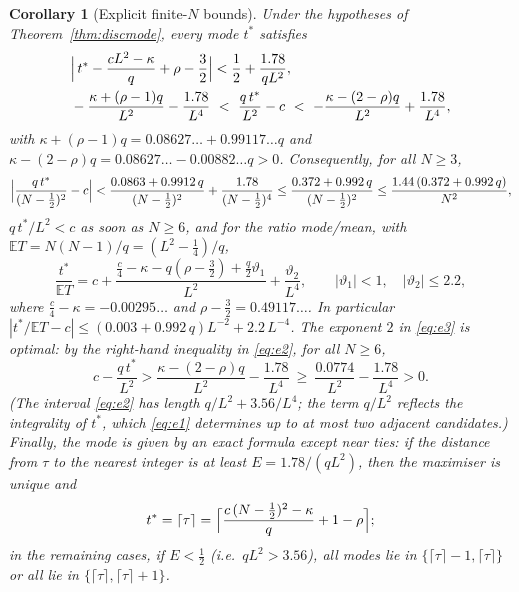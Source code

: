 \documentclass[11pt,a4paper]{article}
\newtheorem{corollary}[theorem]{Corollary}
\theoremstyle{definition}
\theoremstyle{remark}
\newcommand{\E}{\mathbb{E}}
\begin{document}
\begin{corollary}[Explicit finite-$N$ bounds]\label{cor:explicit}
Under the hypotheses of Theorem~\ref{thm:discmode}, every mode $t^*$ satisfies
\begin{align}
 &\Bigl|\,t^*-\frac{cL^2-\kappa}{q}+\rho-\frac32\Bigr|<\frac12+\frac{1.78}{qL^2},\label{eq:e1}\\
 &-\frac{\kappa+(\rho-1)q}{L^2}-\frac{1.78}{L^4}\ <\ \frac{q\,t^*}{L^2}-c\ <\ -\frac{\kappa-(2-\rho)q}{L^2}+\frac{1.78}{L^4},
 \label{eq:e2}
\end{align}
with $\kappa+(\rho-1)q=0.08627\ldots+0.99117\ldots q$ and $\kappa-(2-\rho)q=0.08627\ldots-0.00882\ldots q>0$. Consequently,
for all $N\ge3$,
\begin{equation}\label{eq:e3}
  \Bigl|\frac{q\,t^*}{(N-\frac12)^2}-c\Bigr|<\frac{0.0863+0.9912\,q}{(N-\frac12)^2}+\frac{1.78}{(N-\frac12)^4}
  \le\frac{0.372+0.992\,q}{(N-\frac12)^2}\le\frac{1.44\,(0.372+0.992\,q)}{N^2},
\end{equation}
$q\,t^*/L^2<c$ as soon as $N\ge6$, and for the ratio mode/mean, with $\E T=N(N-1)/q=(L^2-\frac14)/q$,
\begin{equation}\label{eq:e4}
  \frac{t^*}{\E T}=c+\frac{\frac c4-\kappa-q(\rho-\frac32)+\frac q2\vartheta_1}{L^2}+\frac{\vartheta_2}{L^4},\qquad
  |\vartheta_1|<1,\quad|\vartheta_2|\le 2.2 ,
\end{equation}
where $\frac c4-\kappa=-0.00295\ldots$ and $\rho-\frac32=0.49117\ldots$. In particular
$|t^*/\E T-c|\le(0.003+0.992\,q)L^{-2}+2.2\,L^{-4}$.
The exponent $2$ in \eqref{eq:e3} is optimal: by the right-hand inequality in \eqref{eq:e2}, for all $N\ge6$,
\[
   c-\frac{q\,t^*}{L^2}>\frac{\kappa-(2-\rho)q}{L^2}-\frac{1.78}{L^4}\ \ge\ \frac{0.0774}{L^2}-\frac{1.78}{L^4}>0 .
\]
(The interval \eqref{eq:e2} has length $q/L^2+3.56/L^4$; the term $q/L^2$ reflects the integrality of $t^*$, which
\eqref{eq:e1} determines up to at most two adjacent candidates.) Finally, the mode is given by an exact formula
except near ties: if the distance from $\tau$ to the nearest integer is at least $E=1.78/(qL^2)$, then the maximiser
is unique and
\begin{equation}\label{eq:exactmode}
   t^*=\lceil\tau\rceil=\Bigl\lceil\frac{c\,(N-\frac12)^2-\kappa}{q}+1-\rho\Bigr\rceil ;
\end{equation}
in the remaining cases, if $E<\frac12$ (i.e.\ $qL^2>3.56$), all modes lie in $\{\lceil\tau\rceil-1,\lceil\tau\rceil\}$ or
all lie in $\{\lceil\tau\rceil,\lceil\tau\rceil+1\}$.
\end{corollary}
\end{document}
